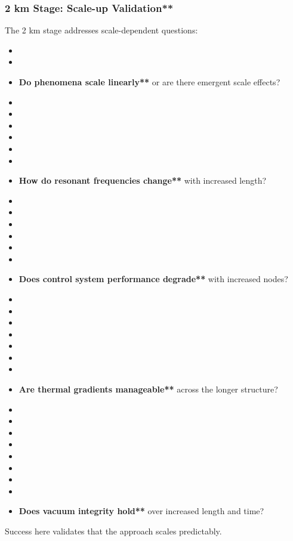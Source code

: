 \subsubsection{2 km Stage: Scale-up Validation**}
The 2 km stage addresses scale-dependent questions:
\begin{itemize}
    \item \item \item \textbf{Do phenomena scale linearly**} or are there emergent scale effects?
    \item \item \item \item \item \item \item \textbf{How do resonant frequencies change**} with increased length?
    \item \item \item \item \item \item \item \textbf{Does control system performance degrade**} with increased nodes?
    \item \item \item \item \item \item \item \item \textbf{Are thermal gradients manageable**} across the longer structure?
    \item \item \item \item \item \item \item \item \item \textbf{Does vacuum integrity hold**} over increased length and time?
\end{itemize}
Success here validates that the approach scales predictably.

